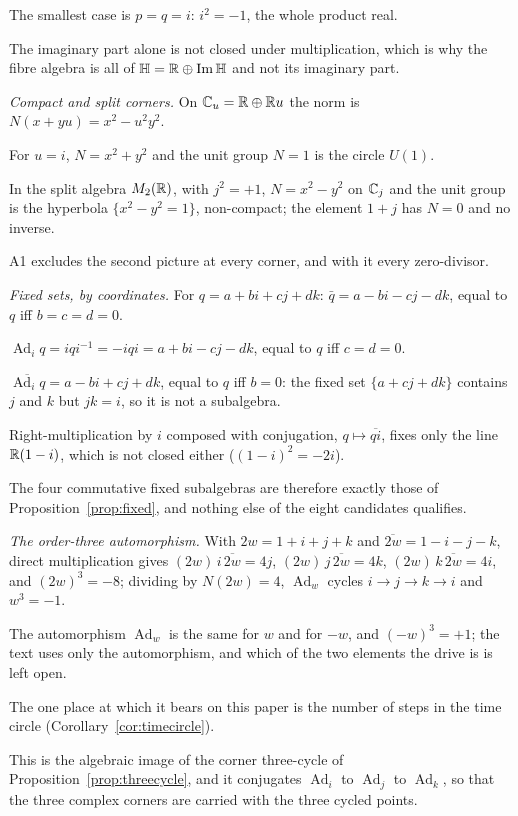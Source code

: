 \documentclass[11pt,a4paper]{article}
\theoremstyle{plain}
\theoremstyle{definition}
\theoremstyle{remark}
\newcommand{\Hquat}{\mathbb{H}}
\newcommand{\ImH}{\operatorname{Im}\Hquat}
\newcommand{\Ad}{\operatorname{Ad}}
\begin{document}
The smallest case is $p=q=i$: $i^{2}=-1$, the whole product real.

The imaginary part alone is not closed under multiplication, which is why the fibre algebra is all of $\Hquat=\R\oplus\ImH$ and not its imaginary part.

\emph{Compact and split corners.} On $\mathbb{C}_{u}=\mathbb{R}\oplus\mathbb{R} u$ the norm is $N(x+yu)=x^{2}-u^{2}y^{2}$.

For $u=i$, $N=x^{2}+y^{2}$ and the unit group $N=1$ is the circle $U(1)$.

In the split algebra $M_{2}(\mathbb{R})$, with $j^{2}=+1$, $N=x^{2}-y^{2}$ on $\mathbb{C}_{j}$ and the unit group is the hyperbola $\{x^{2}-y^{2}=1\}$, non-compact; the element $1+j$ has $N=0$ and no inverse.

A1 excludes the second picture at every corner, and with it every zero-divisor.

\emph{Fixed sets, by coordinates.} For $q=a+bi+cj+dk$: $\bar q=a-bi-cj-dk$, equal to $q$ iff $b=c=d=0$.

$\Ad_{i}q=iqi^{-1}=-iqi=a+bi-cj-dk$, equal to $q$ iff $c=d=0$.

$\overline{\Ad_{i}q}=a-bi+cj+dk$, equal to $q$ iff $b=0$: the fixed set $\{a+cj+dk\}$ contains $j$ and $k$ but $jk=i$, so it is not a subalgebra.

Right-multiplication by $i$ composed with conjugation, $q\mapsto\overline{qi}$, fixes only the line $\mathbb{R}(1-i)$, which is not closed either ($(1-i)^{2}=-2i$).

The four commutative fixed subalgebras are therefore exactly those of Proposition~\ref{prop:fixed}, and nothing else of the eight candidates qualifies.

\emph{The order-three automorphism.} With $2w=1+i+j+k$ and $\overline{2w}=1-i-j-k$, direct multiplication gives $(2w)\,i\,\overline{2w}=4j$, $(2w)\,j\,\overline{2w}=4k$, $(2w)\,k\,\overline{2w}=4i$, and $(2w)^{3}=-8$; dividing by $N(2w)=4$, $\Ad_{w}$ cycles $i\to j\to k\to i$ and $w^{3}=-1$.

The automorphism $\Ad_{w}$ is the same for $w$ and for $-w$, and $(-w)^{3}=+1$; the text uses only the automorphism, and which of the two elements the drive is is left open.

The one place at which it bears on this paper is the number of steps in the time circle (Corollary~\ref{cor:timecircle}).

This is the algebraic image of the corner three-cycle of Proposition~\ref{prop:threecycle}, and it conjugates $\Ad_{i}$ to $\Ad_{j}$ to $\Ad_{k}$, so that the three complex corners are carried with the three cycled points.
\end{document}
